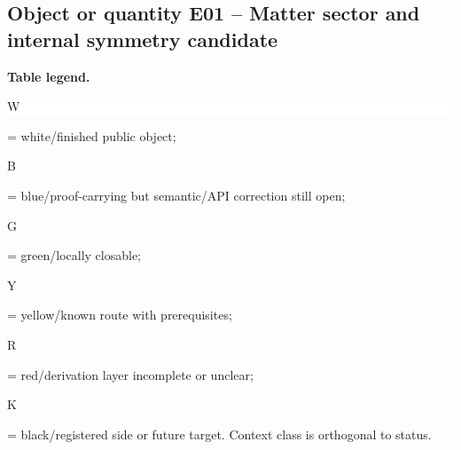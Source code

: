 \subsection*{Object or quantity E01 -- Matter sector and internal symmetry candidate}
\hypertarget{objproof:E01}{}
\par\smallskip\noindent\begin{minipage}{0.99\linewidth}\footnotesize\raggedright\textbf{Table legend.} \colorbox{white}{\strut W} = white/finished public object; \colorbox{cyan!20}{\strut B} = blue/proof-carrying but semantic/API correction still open; \colorbox{green!18}{\strut G} = green/locally closable; \colorbox{yellow!25}{\strut Y} = yellow/known route with prerequisites; \colorbox{red!20}{\strut R} = red/derivation layer incomplete or unclear; \colorbox{black!18}{\strut K} = black/registered side or future target. Context class is orthogonal to status.\end{minipage}\par\vspace{0.25em}
